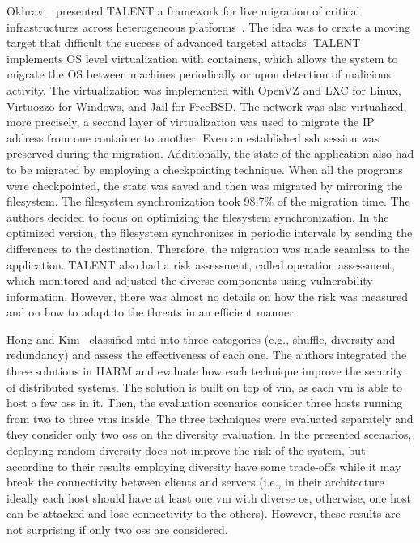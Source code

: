 Okhravi~\etal{} presented \textsc{TALENT} a framework for live migration of critical infrastructures across heterogeneous platforms~\cite{Okhravi:2014,Okhravi:2012}. 
The idea was to create a moving target that difficult the success of advanced targeted attacks. 
TALENT implements OS level virtualization with containers, which allows the system to migrate the OS between machines periodically or upon detection of malicious activity. 
The virtualization was implemented with OpenVZ and LXC for Linux, Virtuozzo for Windows, and Jail for FreeBSD. 
The network was also virtualized, more precisely, a second layer of virtualization was used to migrate the IP address from one container to another. 
Even an established ssh session was preserved during the migration. 
Additionally, the state of the application also had to be migrated by employing a checkpointing technique. 
When all the programs were checkpointed, the state was saved and then was migrated by mirroring the filesystem. 
The filesystem synchronization took 98.7\% of the migration time. 
The authors decided to focus on optimizing the filesystem synchronization. 
In the optimized version, the filesystem synchronizes in periodic intervals by sending the differences to the destination. 
Therefore, the migration was made seamless to the application. 
TALENT also had a risk assessment, called operation assessment, which monitored and adjusted the diverse components using vulnerability information. 
However, there was almost no details on how the risk was measured and on how to adapt to the threats in an efficient manner.

Hong and Kim~\cite{Hong:2015} classified \gls{mtd} into three categories (e.g., shuffle, diversity and redundancy) and assess the effectiveness of each one.
The authors integrated the three solutions in \textsc{HARM} and evaluate how each technique improve the security of distributed systems.
The solution is built on top of \gls{vm}, as each \gls{vm} is able to host a few \glspl{os} in it.
Then, the evaluation scenarios consider three hosts running from two to three \glspl{vm} inside.
The three techniques were evaluated separately and they consider only two \glspl{os} on the diversity evaluation.
In the presented scenarios, deploying random diversity does not improve the risk of the system, but according to their results employing diversity have some trade-offs while it may break the connectivity between clients and servers (i.e., in their architecture ideally each host should have at least one \gls{vm} with diverse \gls{os}, otherwise, one host can be attacked and lose connectivity to the others).
However, these results are not surprising if only two \glspl{os} are considered. 

